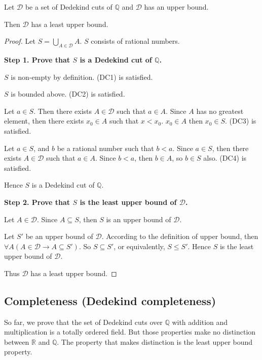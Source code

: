 \begin{theorem}
    Let $\mathcal{D}$ be a set of Dedekind cuts of $\mathbb{Q}$ and $\mathcal{D}$ has an upper bound.

    Then $\mathcal{D}$ has a least upper bound.
\end{theorem}

\begin{proof}
    Let $S = \bigcup\limits_{A\in\mathcal{D}} A$. $S$ consists of rational numbers.

    \textbf{Step 1. Prove that $S$ is a Dedekind cut of $\mathbb{Q}$.}

    $S$ is non-empty by definition. (DC1) is satisfied.

    $S$ is bounded above. (DC2) is satisfied.

    Let $a\in S$. Then there exists $A\in\mathcal{D}$ such that $a\in A$. Since $A$ has no greatest element, then there exists $x_{0}\in A$ such that $x < x_{0}$. $x_{0}\in A$ then $x_{0}\in S$. (DC3) is satisfied.

    Let $a\in S$, and $b$ be a rational number such that $b < a$. Since $a\in S$, then there exists $A\in\mathcal{D}$ such that $a\in A$. Since $b < a$, then $b\in A$, so $b\in S$ also. (DC4) is satisfied.

    Hence $S$ is a Dedekind cut of $\mathbb{Q}$.
    \bigskip

    \textbf{Step 2. Prove that $S$ is the least upper bound of $\mathcal{D}$.}

    Let $A\in\mathcal{D}$. Since $A\subseteq S$, then $S$ is an upper bound of $\mathcal{D}$.

    Let $S'$ be an upper bound of $\mathcal{D}$. According to the definition of upper bound, then $\forall A (A\in\mathcal{D}\rightarrow A\subseteq S')$. So $S\subseteq S'$, or equivalently, $S\le S'$. Hence $S$ is the least upper bound of $\mathcal{D}$.

    Thus $\mathcal{D}$ has a least upper bound.
\end{proof}

\subsection{Completeness (Dedekind completeness)}

So far, we prove that the set of Dedekind cuts over $\mathbb{Q}$ with addition and multiplication is a totally ordered field. But those properties make no distinction between $\mathbb{R}$ and $\mathbb{Q}$. The property that makes distinction is the least upper bound property.

